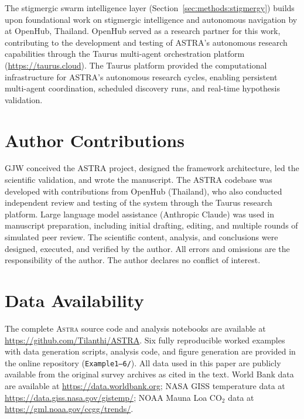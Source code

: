 \documentclass[usenatbib]{rasti}
\newcommand{\astra}{\textsc{Astra}\xspace}
\begin{document}
The stigmergic swarm intelligence layer (Section~\ref{sec:methods:stigmergy}) builds upon foundational work on stigmergic intelligence and autonomous navigation by \citet{Dey2025} at OpenHub, Thailand.
OpenHub served as a research partner for this work, contributing to the development and testing of ASTRA's autonomous research capabilities through the Taurus multi-agent orchestration platform (\url{https://taurus.cloud}).
The Taurus platform provided the computational infrastructure for ASTRA's autonomous research cycles, enabling persistent multi-agent coordination, scheduled discovery runs, and real-time hypothesis validation.

\section*{Author Contributions}

GJW conceived the ASTRA project, designed the framework architecture, led the scientific validation, and wrote the manuscript.
The ASTRA codebase was developed with contributions from OpenHub (Thailand), who also conducted independent review and testing of the system through the Taurus research platform.
Large language model assistance (Anthropic Claude) was used in manuscript preparation, including initial drafting, editing, and multiple rounds of simulated peer review.
The scientific content, analysis, and conclusions were designed, executed, and verified by the author.
All errors and omissions are the responsibility of the author.
The author declares no conflict of interest.

\section*{Data Availability}

The complete \astra source code and analysis notebooks are available at \url{https://github.com/Tilanthi/ASTRA}.
Six fully reproducible worked examples with data generation scripts, analysis code, and figure generation are provided in the online repository (\texttt{Example1--6/}).
All data used in this paper are publicly available from the original survey archives as cited in the text.
World Bank data are available at \url{https://data.worldbank.org}; NASA GISS temperature data at \url{https://data.giss.nasa.gov/gistemp/}; NOAA Mauna Loa CO$_{2}$ data at \url{https://gml.noaa.gov/ccgg/trends/}.



\end{document}
